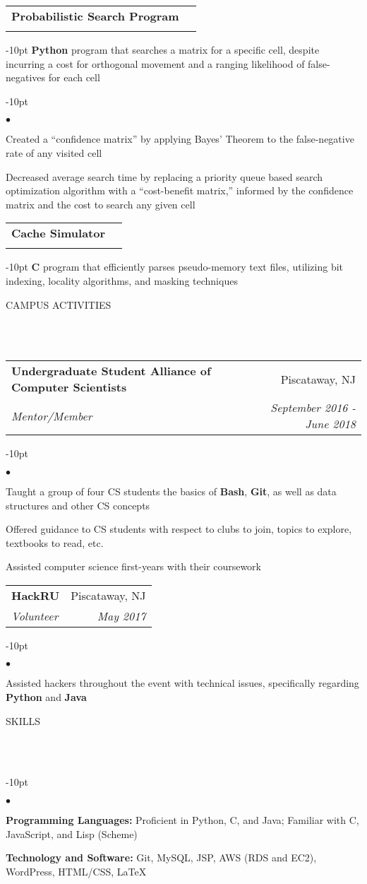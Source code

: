 \documentclass[12pt]{article}
\makeatletter
\newcommand{\lineunder}{
	\vspace*{-8pt} \\ 
	\hspace*{-18pt} 
	\hrulefill \\
}
\newcommand{\header}[1]{
	\vspace*{12pt}
	{\hspace*{-14pt}\vspace*{6pt} #1} %
	\vspace*{-6pt} 
	\lineunder
}
\newenvironment{achievements}{
\begin{adjustwidth}{-10pt}{}
  \begin{list}{$\bullet$}{
  	\topsep 0pt \itemsep -4pt}}
  	{\vspace*{2pt}\end{list}
\end{adjustwidth}
}
\def\cpp{
	{\hspace{-0.25em}C\nolinebreak[4]\hspace{-.05em}\raisebox{.4ex}{\tiny		\bf ++}}}
\newcommand{\subheading}[4]{
 	\vspace{5pt}
    	\begin{tabular*}{1.01\textwidth}
    		{l@{\extracolsep{\fill}}r}
      		\hspace{-16pt}\textbf{#1} & #2 \\
      		\hspace{-16pt}\textit{\small#3} & \textit{\small #4} \\
    	\end{tabular*}
    \vspace{-4pt}
}
\makeatother
\begin{document}
\subheading{Probabilistic Search Program}{}{}{}
	\vspace{-15pt}	
	\begin{adjustwidth}{-10pt}{}
	\textbf{Python} program that searches a matrix for a specific cell, despite incurring a cost for orthogonal movement and a ranging likelihood of false-negatives for each cell
	\end{adjustwidth}
	\begin{achievements}
		\item Created a ``confidence matrix'' by applying Bayes' Theorem to the false-negative rate of any visited cell
		\vspace{4pt}		
		\item Decreased average search time by replacing a priority queue based search optimization algorithm with a ``cost-benefit matrix,'' informed by the confidence matrix and the cost to search any given cell
	\end{achievements}
	
\subheading{Cache Simulator}{}{}{}
	\vspace{-15pt}
	\begin{adjustwidth}{-10pt}{}
	\textbf{C} program that efficiently parses pseudo-memory text files, utilizing bit indexing, locality algorithms, and masking techniques
	\end{adjustwidth}
\vspace*{4pt}


\header{CAMPUS ACTIVITIES}

\subheading
	{Undergraduate Student Alliance of Computer Scientists}{Piscataway, NJ}
	{Mentor/Member}{September 2016 - June 2018}
	\begin{achievements}
		\item Taught a group of four CS students the basics of \textbf{Bash}, \textbf{Git}, as well as data structures and other CS concepts
		\item Offered guidance to CS students with respect to clubs to join, topics to explore, textbooks to read, etc.
		\item Assisted computer science first-years with their coursework
	\end{achievements}
	
\subheading
	{HackRU}{Piscataway, NJ}
	{Volunteer}{May 2017}
	\begin{achievements}
		\item Assisted hackers throughout the event with technical issues, specifically regarding \textbf{Python} and \textbf{Java}
	\end{achievements}

	
\header{SKILLS}
	\begin{achievements}
		\item{\bf Programming Languages:} Proficient in Python, C, and Java; Familiar with \cpp, JavaScript, and Lisp (Scheme)
		\item{\bf Technology and Software:} Git, MySQL, JSP, AWS (RDS and EC2), WordPress, HTML/CSS, \LaTeX
	\end{achievements}
\end{document}
